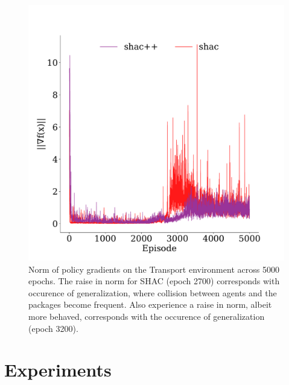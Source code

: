 \begin{figure}[t]
    \includegraphics[width=\columnwidth]{figs/grads-transformer-transport.pdf}
    \caption{Norm of policy gradients on the Transport environment across 5000 epochs. The raise in norm for SHAC (epoch 2700) corresponds with occurence of generalization, where collision between agents and the packages become frequent. Also \fname{} experience a raise in norm, albeit more behaved, corresponds with the occurence of generalization (epoch 3200).}
\end{figure}

\section{Experiments}\label{sect:experiments}


